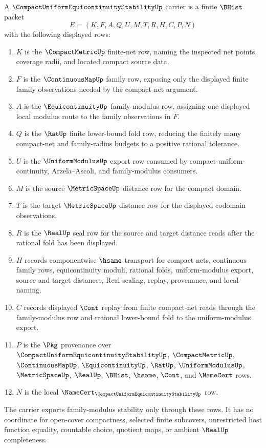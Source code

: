 \begin{definition}\label{def:compact-uniform-equicontinuity-stability-carrier}
A $\CompactUniformEquicontinuityStabilityUp$ carrier is a finite $\BHist$ packet
$$
E=(K,F,A,Q,U,M,T,R,H,C,P,N)
$$
with the following displayed rows:
\begin{enumerate}
\item $K$ is the $\CompactMetricUp$ finite-net row, naming the inspected net points, coverage radii, and located compact source data.
\item $F$ is the $\ContinuousMapUp$ family row, exposing only the displayed finite family observations needed by the compact-net argument.
\item $A$ is the $\EquicontinuityUp$ family-modulus row, assigning one displayed local modulus route to the family observations in $F$.
\item $Q$ is the $\RatUp$ finite lower-bound fold row, reducing the finitely many compact-net and family-radius budgets to a positive rational tolerance.
\item $U$ is the $\UniformModulusUp$ export row consumed by compact-uniform-continuity, Arzela--Ascoli, and family-modulus consumers.
\item $M$ is the source $\MetricSpaceUp$ distance row for the compact domain.
\item $T$ is the target $\MetricSpaceUp$ distance row for the displayed codomain observations.
\item $R$ is the $\RealUp$ seal row for the source and target distance reads after the rational fold has been displayed.
\item $H$ records componentwise $\hsame$ transport for compact nets, continuous family rows, equicontinuity moduli, rational folds, uniform-modulus export, source and target distances, Real sealing, replay, provenance, and local naming.
\item $C$ records displayed $\Cont$ replay from finite compact-net reads through the family-modulus row and rational lower-bound fold to the uniform-modulus export.
\item $P$ is the $\Pkg$ provenance over $\CompactUniformEquicontinuityStabilityUp$, $\CompactMetricUp$, $\ContinuousMapUp$, $\EquicontinuityUp$, $\RatUp$, $\UniformModulusUp$, $\MetricSpaceUp$, $\RealUp$, $\BHist$, $\hsame$, $\Cont$, and $\NameCert$ rows.
\item $N$ is the local $\NameCert_{\CompactUniformEquicontinuityStabilityUp}$ row.
\end{enumerate}
The carrier exports family-modulus stability only through these rows. It has no coordinate for open-cover compactness, selected finite subcovers, unrestricted host function equality, countable choice, quotient maps, or ambient $\RealUp$ completeness.
\end{definition}

